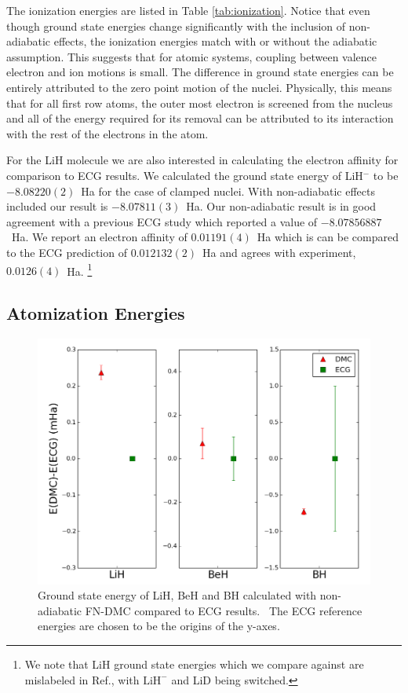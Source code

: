 \documentclass[pra,superscriptaddress,groupedaddress,twocolumn]{revtex4}
\begin{document}
The ionization energies are listed in Table \ref{tab:ionization}.  Notice that even though ground state energies change significantly with the inclusion of non-adiabatic effects, the ionization energies match with or without the adiabatic assumption. This suggests that for atomic systems, coupling between valence electron and ion motions is small. The difference in ground state energies can be entirely attributed to the zero point motion of the nuclei. Physically, this means that for all first row atoms, the outer most electron is screened from the nucleus and all of the energy required for its removal can be attributed to its interaction with the rest of the electrons in the atom.

For the LiH molecule we are also interested in calculating the electron affinity for comparison to ECG results. We calculated the ground state energy of LiH$^-$ to be $-8.08220(2)$~Ha for the case of clamped nuclei.  With non-adiabatic effects included our result is  $-8.07811(3)$~Ha. Our non-adiabatic result is in good agreement with a previous ECG study \cite{Bubin_LiH_noBO} which reported a value of $-8.07856887$~Ha. We report an electron affinity of $0.01191(4)$~Ha which is can be compared to the ECG prediction of $0.012132(2)$~Ha and agrees with experiment, $0.0126(4)$~Ha. \footnote{We note that LiH ground state energies which we compare against are mislabeled in Ref.\cite{Bubin_LiH_noBO}, with $\text{LiH}^-$ and LiD being switched.}

\subsection{Atomization Energies}

\begin{figure}
\centering
\includegraphics[scale=.4]{Figures/dia-ECG}
\caption{Ground state energy of LiH, BeH and BH calculated with non-adiabatic FN-DMC compared to ECG results.~\cite{Adamowicz_LiH,Koput_BeH,Miliordos_BH} The ECG reference energies are chosen to be the origins of the y-axes.}
\end{figure}
\end{document}
